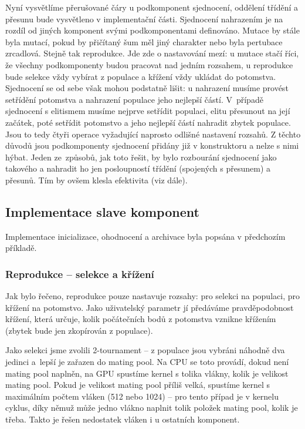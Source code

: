 Nyní vysvětlíme přerušované čáry u podkomponent sjednocení, oddělení třídění a přesunu bude vysvětleno v implementační části. Sjednocení nahrazením je na rozdíl od jiných komponent svými podkomponentami definováno. Mutace by stále byla mutací, pokud by přičítaný šum měl jiný charakter nebo byla pertubace zrcadlová. Stejně tak reprodukce. Jde zde o nastavování mezí: u mutace stačí říci, že všechny podkomponenty budou pracovat nad jedním rozsahem, u reprodukce bude selekce vždy vybírat z populace a křížení vždy ukládat do potomstva. Sjednocení se od sebe však mohou podstatně lišit: u nahrazení musíme provést setřídění potomstva a nahrazení populace jeho nejlepší částí. V~případě sjednocení s elitismem musíme nejprve setřídit populaci, elitu přesunout na její začátek, poté setřídit potomstvo a jeho nejlepší částí nahradit zbytek populace. Jsou to tedy čtyři operace vyžadující naprosto odlišné nastavení rozsahů. Z těchto důvodů jsou podkomponenty sjednocení přidány již v konstruktoru a nelze s nimi hýbat. Jeden ze~způsobů, jak toto řešit, by bylo rozbourání sjednocení jako takového a nahradit ho jen posloupností třídění (spojených s přesunem) a přesunů. Tím by ovšem klesla efektivita (viz dále).

\subsection{Implementace slave komponent}

Implementace inicializace, ohodnocení a archivace byla popsána v předchozím příkladě.

\subsubsection{Reprodukce -- selekce a křížení}

Jak bylo řečeno, reprodukce pouze nastavuje rozsahy: pro selekci na populaci, pro křížení na potomstvo. Jako uživatelský parametr jí předáváme pravděpodobnost křížení, která určuje, kolik počátečních bodů z potomstva vznikne křížením (zbytek bude jen zkopírován z populace).

Jako selekci jsme zvolili 2-tournament -- z populace jsou vybráni náhodně dva jedinci a~lepší je zařazen do mating pool. Na CPU se toto provádí, dokud není mating pool naplněn, na GPU spustíme kernel s tolika vlákny, kolik je velikost mating pool. Pokud je velikost mating pool příliš velká, spustíme kernel s maximálním počtem vláken (512 nebo 1024) -- pro tento případ je v kernelu cyklus, díky němuž může jedno vlákno naplnit tolik položek mating pool, kolik je třeba. Takto je řešen nedostatek vláken i u ostatních komponent.

